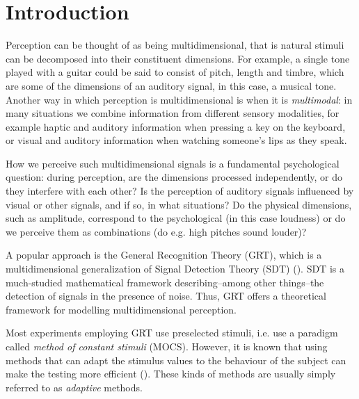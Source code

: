 \documentclass{article}\usepackage{knitr}
\begin{document}
\newpage

\tableofcontents

\newpage

\setcounter{page}{1}

\newpage


\section{Introduction}

Perception can be thought of as being multidimensional, that is natural stimuli can be decomposed into their constituent dimensions. For example, a single tone played with a guitar could be said to consist of pitch, length and timbre, which are some of the dimensions of an auditory signal, in this case, a musical tone. Another way in which perception is multidimensional is when it is \textit{multimodal}: in many situations we combine information from different sensory modalities, for example haptic and auditory information when pressing a key on the keyboard, or visual and auditory information when watching someone's lips as they speak.

How we perceive such multidimensional signals is a fundamental psychological question: during perception, are the dimensions processed independently, or do they interfere with each other? Is the perception of auditory signals influenced by visual or other signals, and if so, in what situations? Do the physical dimensions, such as amplitude, correspond to the psychological (in this case loudness) or do we perceive them as combinations (do e.g. high pitches sound louder)?

A popular approach is the General Recognition Theory (GRT), which is a multidimensional generalization of Signal Detection Theory (SDT) (\citealp{wickens2002,ashby1986, ashby2015}). SDT is a much-studied mathematical framework describing--among other things--the detection of signals in the presence of noise. Thus, GRT offers a theoretical framework for modelling multidimensional perception. 

Most experiments employing GRT use preselected stimuli, i.e. use a paradigm called \textit{method of constant stimuli} (MOCS).  However, it is known that using methods that can adapt the stimulus values to the behaviour of the subject can make the testing more efficient (\citealp{kontsevichtyler1999}). These kinds of methods are usually simply referred to as \textit{adaptive} methods.
\end{document}
